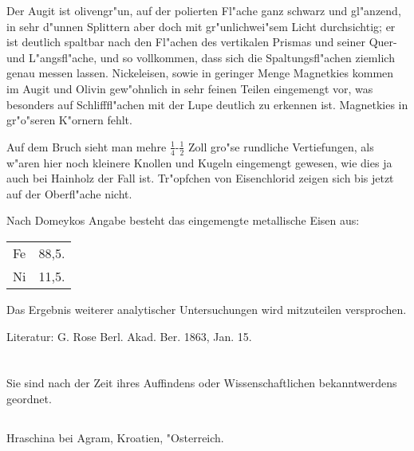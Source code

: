 \documentclass[a4paper, 11pt, oneside]{article}
\begin{document}
Der Augit ist olivengr"un, auf der polierten Fl"ache ganz schwarz und gl"anzend, in sehr d"unnen Splittern aber doch mit gr"unlichwei"sem Licht durchsichtig; er ist deutlich spaltbar nach den Fl"achen des vertikalen Prismas und seiner Quer- und L"angsfl"ache, und so vollkommen, dass sich die Spaltungsfl"achen ziemlich genau messen lassen. Nickeleisen, sowie in geringer Menge Magnetkies kommen im Augit und Olivin gew"ohnlich in sehr feinen Teilen eingemengt vor, was besonders auf Schlifffl"achen mit der Lupe deutlich zu erkennen ist. Magnetkies in gr"o"seren K"ornern fehlt.

Auf dem Bruch sieht man mehre $\mathfrak{\frac{1}{4}}$-$\mathfrak{\frac{1}{2}}$ Zoll gro"se rundliche Vertiefungen, als w"aren hier noch kleinere Knollen und Kugeln eingemengt gewesen, wie dies ja auch bei Hainholz der Fall ist. Tr"opfchen von Eisenchlorid zeigen sich bis jetzt auf der Oberfl"ache nicht.

Nach Domeykos Angabe besteht das eingemengte metallische Eisen aus:
\begin{table}[!ht]
    \centering\swabfamily\Large
    \begin{tabular}{l l}
        Fe & 88,5. \\
        Ni & 11,5. \\
    \end{tabular}
\end{table}

Das Ergebnis weiterer analytischer Untersuchungen wird mitzuteilen versprochen.

\normalsize
Literatur: G. Rose Berl. Akad. Ber. 1863, Jan. 15.
\clearpage
\section{}
\LARGE
\paragraph{}
Sie sind nach der Zeit ihres Auffindens oder Wissenschaftlichen bekanntwerdens geordnet.
\subsection{}
\paragraph{}
Hraschina bei Agram, Kroatien, "Osterreich.
\end{document}
